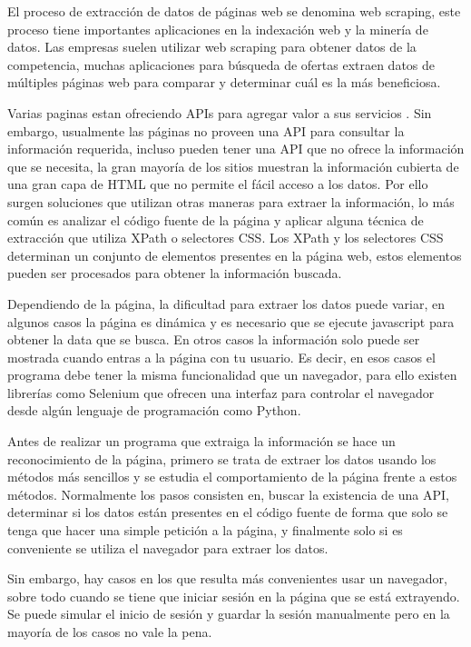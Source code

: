 \documentclass[12pt]{report}
\begin{document}
El proceso de extracción de datos de páginas web se denomina web scraping, este proceso tiene importantes aplicaciones en la indexación web y la minería de datos. Las empresas suelen utilizar web scraping para obtener datos de la competencia, muchas aplicaciones para búsqueda de ofertas extraen datos de múltiples páginas web para comparar y determinar cuál es la más beneficiosa.

Varias paginas estan ofreciendo APIs para agregar valor a sus servicios \cite{penman2009web}. Sin embargo, usualmente las páginas no proveen una API para consultar la información requerida, incluso pueden tener una API que no ofrece la información que se necesita, la gran mayoría de los sitios muestran la información cubierta de una gran capa de HTML que no permite el fácil acceso a los datos. Por ello surgen soluciones que utilizan otras maneras para extraer la información, lo más común es analizar el código fuente de la página y aplicar alguna técnica de extracción que utiliza XPath o selectores CSS. Los XPath y los selectores CSS determinan un conjunto de elementos presentes en la página web, estos elementos pueden ser procesados para obtener la información buscada.

Dependiendo de la página, la dificultad para extraer los datos puede variar, en algunos casos la página es dinámica y es necesario que se ejecute javascript para obtener la data que se busca. En otros casos la información solo puede ser mostrada cuando entras a la página con tu usuario. Es decir, en esos casos el programa debe tener la misma funcionalidad que un navegador, para ello existen librerías como Selenium que ofrecen una interfaz para controlar el navegador desde algún lenguaje de programación como Python.

Antes de realizar un programa que extraiga la información se hace un reconocimiento de la página, primero se trata de extraer los datos usando los métodos más sencillos y se estudia el comportamiento de la página frente a estos métodos. Normalmente los pasos consisten en, buscar la existencia de una API, determinar si los datos están presentes en el código fuente de forma que solo se tenga que hacer una simple petición a la página, y finalmente solo si es conveniente se utiliza el navegador para extraer los datos.

Sin embargo, hay casos en los que resulta más convenientes usar un navegador, sobre todo cuando se tiene que iniciar sesión en la página que se está extrayendo. Se puede simular el inicio de sesión y guardar la sesión manualmente pero en la mayoría de los casos no vale la pena.
\end{document}
